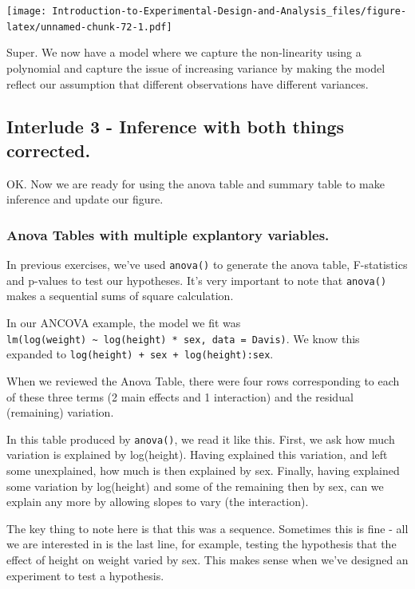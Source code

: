 \documentclass[
]{book}
\begin{document}
\texttt{[image: Introduction-to-Experimental-Design-and-Analysis\_files/figure-latex/unnamed-chunk-72-1.pdf]}

Super. We now have a model where we capture the non-linearity using a polynomial and capture the issue of increasing variance by making the model reflect our assumption that different observations have different variances.

\hypertarget{interlude-3---inference-with-both-things-corrected.}{%
\subsection{Interlude 3 - Inference with both things corrected.}\label{interlude-3---inference-with-both-things-corrected.}}

OK. Now we are ready for using the anova table and summary table to make inference and update our figure.

\hypertarget{anova-tables-with-multiple-explantory-variables.}{%
\subsubsection{Anova Tables with multiple explantory variables.}\label{anova-tables-with-multiple-explantory-variables.}}

In previous exercises, we've used \texttt{anova()} to generate the anova table, F-statistics and p-values to test our hypotheses. It's very important to note that \texttt{anova()} makes a sequential sums of square calculation.

In our ANCOVA example, the model we fit was \texttt{lm(log(weight)\ \textasciitilde{}\ log(height)\ *\ sex,\ data\ =\ Davis)}. We know this expanded to \texttt{log(height)\ +\ sex\ +\ log(height):sex}.

When we reviewed the Anova Table, there were four rows corresponding to each of these three terms (2 main effects and 1 interaction) and the residual (remaining) variation.

In this table produced by \texttt{anova()}, we read it like this. First, we ask how much variation is explained by log(height). Having explained this variation, and left some unexplained, how much is then explained by sex. Finally, having explained some variation by log(height) and some of the remaining then by sex, can we explain any more by allowing slopes to vary (the interaction).

The key thing to note here is that this was a sequence. Sometimes this is fine - all we are interested in is the last line, for example, testing the hypothesis that the effect of height on weight varied by sex. This makes sense when we've designed an experiment to test a hypothesis.
\end{document}
